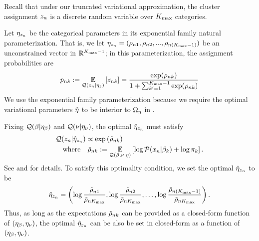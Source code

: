 \begin{ex}
Recall that under our truncated variational approximation,
the cluster assignment $z_n$ is a discrete random variable
over ${K_{\mathrm{max}}}$ categories.

Let $\eta_{z_n}$ be the categorical parameters in its exponential family
natural parameterization. That is, we let $\eta_{z_n} = (\rho_{n1},
\rho_{n2}, ..., \rho_{n({K_{\mathrm{max}}}-1)})$ be an unconstrained vector in
$\mathbb{R}^{{K_{\mathrm{max}}}-1}$; in this parameterization, the assignment probabilities
are
%
\begin{align*}
  p_{nk} := \underset{\mathcal{Q}(z_n \vert \eta_{z})}{\mathbb{E}}\left[z_{nk}\right] =
  \frac{\exp(\rho_{nk})}{1 + \sum_{k'=1}^{{K_{\mathrm{max}}}-1}\exp(\rho_{nk})}
\end{align*}
%
We use the exponential family parameterization because we require the optimal
variational parameters $\hat\eta$ to be interior to $\Omega_{\eta}$ in
.

Fixing $\mathcal{Q}(\beta\vert\eta_{\beta})$ and $\mathcal{Q}(\nu\vert\eta_{\nu})$,
the optimal $\hat\eta_{z_n}$ must satisfy
%
\begin{align*}
& \mathcal{Q}(z_n | \hat\eta_{z_n}) \propto \exp\left(\tilde \rho_{nk}\right)\\
& \quad\textrm{where}\quad \tilde \rho_{nk} := \underset{\mathcal{Q}(\beta, \nu \vert \eta)}{\mathbb{E}}\left[\log \mathcal{P}(x_n \vert \beta_k) + \log \pi_k\right].
\end{align*}
%
See \citet{bishop:2006:PRML} and \citet{blei:2017:vi_review} for details.
To satisfy this optimality condition,
we set the optimal $\hat\eta_{z_n}$ to be
%
\begin{align*}
%
\etaopt_{\z_\n} = \left(\log\frac{\tilde\rho_{\n1}}{\tilde\rho_{\n\kmax}},
\log\frac{\tilde\rho_{\n2}}{\tilde\rho_{\n\kmax}}, \ldots,
\log\frac{\tilde\rho_{\n(\kmax-1)}}{\tilde\rho_{\n\kmax}}\right).
%
\end{align*}
%
Thus, as long as the expectations $\tilde\rho_{nk}$ can be provided
as a closed-form function of
$(\eta_{\beta}, \eta_{\nu})$, the optimal $\hat\eta_{z_n}$ can be also be set in closed-form as
a function of $(\eta_{\beta}, \eta_{\nu})$.
%
\end{ex}
%

